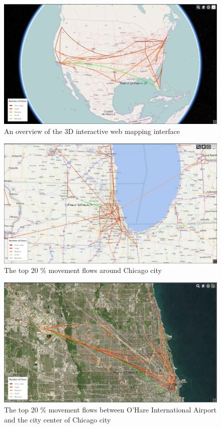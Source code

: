 \documentclass[ijgi,article,submit,moreauthors,pdftex,10pt,a4paper]{mdpi}
\theoremstyle{mdpi}
\newcounter{re}
\theoremstyle{mdpidefinition}
\begin{document}
\begin{figure}[ht]
\centering
\includegraphics[width=0.8\linewidth]{./figures/all}
\caption{An overview of the 3D interactive web mapping interface}
\label{fig:Web_Interface}
\end{figure}
\FloatBarrier

\begin{figure}[ht]
\centering
\includegraphics[width=0.8\linewidth]{./figures/Chicago}
\caption{The top 20 $\%$ movement flows around Chicago city}
\label{fig:chicago}
\end{figure}
\FloatBarrier

\begin{figure}[ht]
\centering
\includegraphics[width=0.8\linewidth]{./figures/Chicago_airport}
\caption{The top 20 $\%$ movement flows between O'Hare International Airport and the city center of Chicago city}
\label{fig:Chicago_airport}
\end{figure}
\FloatBarrier
\end{document}
